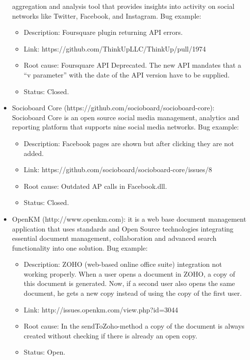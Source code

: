 \begin{itemize}
  aggregation and analysis tool that provides insights into activity on
  social networks like Twitter, Facebook, and Instagram.  Bug example:
  \begin{itemize}
    \item Description:  Foursquare plugin returning API errors.
    \item Link: https://github.com/ThinkUpLLC/ThinkUp/pull/1974
    \item Root cause: Foursquare API Deprecated. The new API mandates that
    a ``v parameter'' with the date of the API version have to be supplied.
    \item Status: Closed.
  \end{itemize}
  \item Socioboard Core (https://github.com/socioboard/socioboard-core):
  Socioboard Core is an open source social media management, analytics and reporting platform that supports nine social media
  networks. Bug example:
  \begin{itemize}
    \item Description: Facebook pages are shown but after clicking they are not
    added.
    \item Link: https://github.com/socioboard/socioboard-core/issues/8
    \item Root cause:  Outdated AP calls in Facebook.dll.
    \item Status: Closed.
  \end{itemize}
  \item OpenKM (http://www.openkm.com): it is a web base document management
  application that uses standards and Open Source technologies integrating
  essential document management, collaboration and advanced search functionality into one solution.  Bug example:
  \begin{itemize}
    \item Description: ZOHO (web-based online office suite) integration not
    working properly. When a user opens a document in ZOHO, a copy of this document is generated. Now, if a second user also opens the same document, he gets a new copy instead of using the copy of the first user.
    \item Link: http://issues.openkm.com/view.php?id=3044
    \item Root cause: In the sendToZoho-method a copy of the document is always
    created without checking if there is already an open copy.
    \item Status: Open.
  \end{itemize}

\end{itemize}
